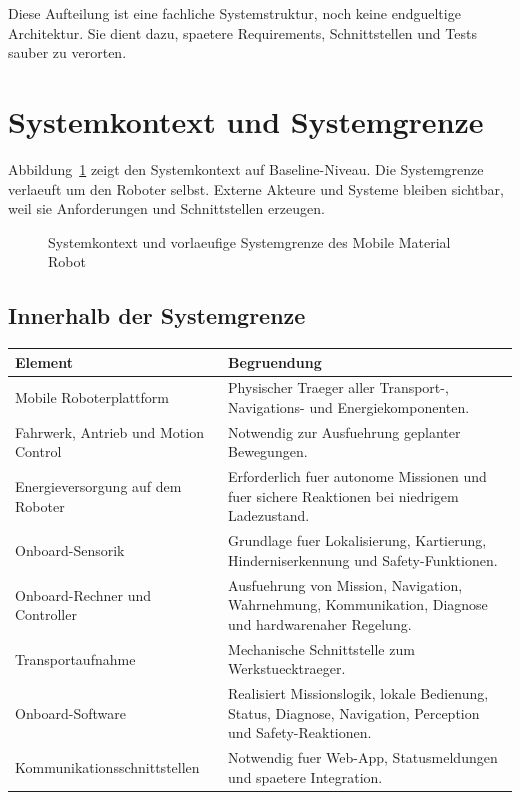 Diese Aufteilung ist eine fachliche Systemstruktur, noch keine endgueltige Architektur. Sie dient dazu, spaetere Requirements, Schnittstellen und Tests sauber zu verorten.

\section{Systemkontext und Systemgrenze}

Abbildung~\ref{fig:system-context-boundary} zeigt den Systemkontext auf Baseline-Niveau. Die Systemgrenze verlaeuft um den Roboter selbst. Externe Akteure und Systeme bleiben sichtbar, weil sie Anforderungen und Schnittstellen erzeugen.

\begin{figure}[htbp]
  \centering
  \resizebox{\textwidth}{!}{}
  \caption{Systemkontext und vorlaeufige Systemgrenze des Mobile Material Robot}
  \label{fig:system-context-boundary}
\end{figure}

\subsection{Innerhalb der Systemgrenze}

\begin{longtable}{L{0.30\textwidth} L{0.58\textwidth}}
\toprule
Element & Begruendung \\
\midrule
Mobile Roboterplattform & Physischer Traeger aller Transport-, Navigations- und Energiekomponenten. \\
Fahrwerk, Antrieb und Motion Control & Notwendig zur Ausfuehrung geplanter Bewegungen. \\
Energieversorgung auf dem Roboter & Erforderlich fuer autonome Missionen und fuer sichere Reaktionen bei niedrigem Ladezustand. \\
Onboard-Sensorik & Grundlage fuer Lokalisierung, Kartierung, Hinderniserkennung und Safety-Funktionen. \\
Onboard-Rechner und Controller & Ausfuehrung von Mission, Navigation, Wahrnehmung, Kommunikation, Diagnose und hardwarenaher Regelung. \\
Transportaufnahme & Mechanische Schnittstelle zum Werkstuecktraeger. \\
Onboard-Software & Realisiert Missionslogik, lokale Bedienung, Status, Diagnose, Navigation, Perception und Safety-Reaktionen. \\
Kommunikationsschnittstellen & Notwendig fuer Web-App, Statusmeldungen und spaetere Integration. \\
\bottomrule
\end{longtable}

